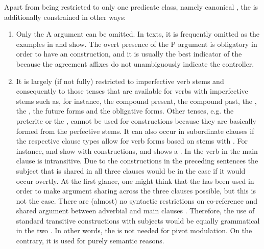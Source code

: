 Apart from being restricted to only one predicate class, namely canonical , the  is additionally constrained in other ways:
%
\begin{enumerate}
	\item	Only the A argument can be omitted. In texts, it is frequently omitted as the examples in  and  show. The overt presence of the P argument is obligatory in order to have an  construction, and it is usually the best indicator of the  because the  agreement affixes do not unambiguously indicate the controller.

	\item	It is largely (if not fully) restricted to imperfective verb stems and consequently to those tenses that are available for verbs with imperfective stems such as, for instance, the compound present, the compound past, the , the , the future forms and the obligative forms. Other tenses, e.g. the preterite or the , cannot be used for  constructions because they are basically formed from the perfective stems. It can also occur in subordinate clauses if the respective clause types allow for verb forms based on stems with . For instance,  and  show  with  constructions, and  shows a . In  the verb in the main clause is intransitive. Due to the  constructions in the preceding sentences the subject that is shared in all three clauses would be in the  case if it would occur overtly. At the first glance, one might think that the  has been used in order to make argument sharing across the three clauses possible, but this is not the case. There are (almost) no syntactic restrictions on co-reference and shared argument between adverbial and main clauses . Therefore, the use of standard transitive constructions with  subjects would be equally grammatical in the two . In other words, the  is not needed for pivot modulation. On the contrary, it is used for purely semantic reasons. 
	\begin{exe}
		

\end{exe}
\end{enumerate}
